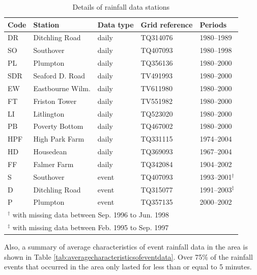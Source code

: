 \begin{table}[htbp]
  \centering
  \caption{Details of rainfall data stations}
  \label{tab:DetailsOfDataStations}
    \small
    \begin{tabular}{lllll}
      \toprule
      \textbf{Code} & \textbf{Station} & \textbf{Data type} &
\textbf{Grid reference} & \textbf{Periods}\\
      \midrule
      DR & Ditchling Road & daily & TQ314076 & 1980--1989\\
      SO & Southover & daily & TQ407093 & 1980--1998\\
      PL & Plumpton & daily & TQ356136 & 1980--2000\\
      SDR & Seaford D. Road & daily & TV491993 & 1980--2000\\
      EW & Eastbourne Wilm. & daily & TV611980 & 1980--2000\\
      FT & Friston Tower & daily & TV551982 & 1980--2000\\
      LI & Litlington & daily & TQ523020 & 1980--2000\\
      PB & Poverty Bottom & daily & TQ467002 & 1980--2000\\
      HPF & High Park Farm & daily & TQ331115 & 1974--2004\\
      HD & Housedean & daily & TQ369093 & 1967--2004\\
      FF & Falmer Farm & daily & TQ342084 & 1904--2002\\
      S & Southover & event & TQ407093 &
1993--2001$^\dagger$\\
      D & Ditchling Road & event & TQ315077 &
1991--2003$^\ddagger$\\
      P & Plumpton & event & TQ357135 & 2000--2002\\
      \bottomrule
      \multicolumn{5}{l}{\footnotesize $^\dagger$  with
missing data between Sep. 1996 to Jun. 1998}\\
      \multicolumn{5}{l}{\footnotesize $^\ddagger$  with
missing data between Feb. 1995 to Sep. 1997}
    \end{tabular}
\end{table}

Also, a summary of average characteristics of event rainfall data in the area is
shown in Table \ref{tab:averagecharacteristicsofeventdata}. Over 75\% of the
rainfall events that occurred in the area only lasted for less than or
equal to 5 minutes. 

